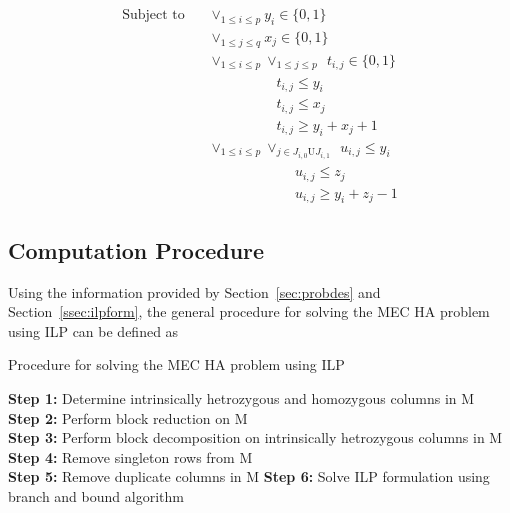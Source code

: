 \documentclass[10pt,twocolumn]{witseiepaper}
\begin{document}
\begin{equation*}
\begin{split}
    \textrm{Subject to} 
    &\ \ \ \ \vee_{1 \le i \le p} y_i \in \{0, 1\}                                              \\
    &\ \ \ \ \vee_{1 \le j \le q} x_j \in \{0, 1\}                                              \\
    &\ \ \ \ \vee_{1 \le i \le p} \vee_{1 \le j \le p} \ \ t_{i,j} \in \{0, 1\}                 \\
    &\ \ \ \ \ \ \ \ \ \ \ \ \ \ \ \ \ \ \ \ \ \ \ \ \ \ t_{i,j} \le y_i                        \\ 
    &\ \ \ \ \ \ \ \ \ \ \ \ \ \ \ \ \ \ \ \ \ \ \ \ \ \ t_{i,j} \le x_j                        \\ 
    &\ \ \ \ \ \ \ \ \ \ \ \ \ \ \ \ \ \ \ \ \ \ \ \ \ \ t_{i,j} \ge y_i + x_j + 1              \\
    &\ \ \ \ \vee_{1 \le i \le p} \vee_{j \in J_{i,0} \textrm{U} J_{i,1}} \ \ u_{i,j} \le y_i   \\
    &\ \ \ \ \ \ \ \ \ \ \ \ \ \ \ \ \ \ \ \ \ \ \ \ \ \ \ \ \ \ \ \ u_{i,j} \le z_j            \\
    &\ \ \ \ \ \ \ \ \ \ \ \ \ \ \ \ \ \ \ \ \ \ \ \ \ \ \ \ \ \ \ \ u_{i,j} \ge y_i + z_j - 1 
    \end{split}
\end{equation*}

\subsection{Computation Procedure}

Using the information provided by Section~\ref{sec:probdes} and Section~\ref{ssec:ilpform}, the general
procedure for solving the MEC HA problem using ILP can be defined as
\begin{algorithm}[t*]\label{alg:proc}
    \small
    \caption{Procedure for solving the MEC HA problem using ILP}
\textbf{Step 1:} Determine intrinsically hetrozygous and homozygous columns in M                        \\
\textbf{Step 2:} Perform block reduction on M                                                           \\
\textbf{Step 3:} Perform block decomposition on intrinsically hetrozygous columns in M                 \\
\textbf{Step 4:} Remove singleton rows from M                                                           \\
\textbf{Step 5:} Remove duplicate columns in M
\textbf{Step 6:} Solve ILP formulation using branch and bound algorithm 
\end{algorithm}
\end{document}
